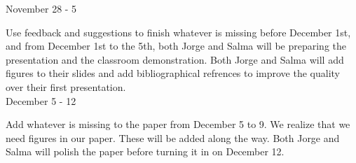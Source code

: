 \setlength{\parindent}{0cm}
November 28 - 5 \\
\setlength{\parindent}{1 em}

Use feedback and suggestions to finish whatever is missing
before December 1st, and from December 1st to the 5th,
both Jorge and Salma will be preparing the presentation and
the classroom demonstration. Both Jorge and Salma will add
figures to their slides and add bibliographical refrences
to improve the quality over their first presentation. \\

\setlength{\parindent}{0cm}
December 5 - 12 \\
\setlength{\parindent}{1 em}

Add whatever is missing to the paper from December 5 to 9.
We realize that we need figures in our paper. These will be
added along the way. Both Jorge and Salma will polish the
paper before turning it in on December 12.

\label{schedule}
